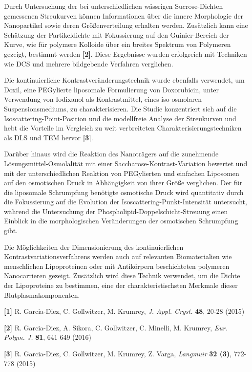 Durch Untersuchung der bei unterschiedlichen wässrigen Sucrose-Dichten gemessenen Streukurven können Informationen über die innere Morphologie der Nanopartikel sowie deren Größenverteilung erhalten werden. Zusätzlich kann eine Schätzung der Partikeldichte mit Fokussierung auf den Guinier-Bereich der Kurve, wie für polymere Kolloide über ein breites Spektrum von Polymeren gezeigt, bestimmt werden \textbf{[2]}. Diese Ergebnisse wurden erfolgreich mit Techniken wie DCS und mehrere bildgebende Verfahren verglichen.

Die kontinuierliche Kontrastveränderungstechnik wurde ebenfalls verwendet, um Doxil, eine PEGylierte liposomale Formulierung von Doxorubicin, unter Verwendung von Iodixanol als Kontrastmittel, eines iso-osmolaren Suspensionsmediums, zu charakterisieren. Die Studie konzentriert sich auf die Isoscattering-Point-Position und die modellfreie Analyse der Streukurven und hebt die Vorteile im Vergleich zu weit verbreiteten Charakterisierungstechniken als DLS und TEM hervor \textbf{[3]}.

Darüber hinaus wird die Reaktion des Nanoträgers auf die zunehmende Lösungsmittel-Osmolalität mit einer Saccharose-Kontrast-Variation bewertet und mit der unterschiedlichen Reaktion von PEGylierten und einfachen Liposomen auf den osmotischen Druck in Abhängigkeit von ihrer Größe verglichen. Der für die liposomale Schrumpfung benötigte osmotische Druck wird quantitativ durch die Fokussierung auf die Evolution der Isoscattering-Punkt-Intensität untersucht, während die Untersuchung der Phospholipid-Doppelschicht-Streuung einen Einblick in die morphologischen Veränderungen der osmotischen Schrumpfung gibt.

Die Möglichkeiten der Dimensionierung des kontinuierlichen Kontrastvariationsverfahrens werden auch auf relevanten Biomaterialien wie menschlichen Lipoproteinen oder mit Antikörpern beschichteten polymeren Nanocarrieren gezeigt. Zusätzlich wird diese Technik verwendet, um die Dichte der Lipoproteine zu bestimmen, eine der charakteristischsten Merkmale dieser Blutplasmakomponenten.

\bigskip
\footnotesize{

\textbf{[1]} R. Garcia-Diez, C. Gollwitzer, M. Krumrey, \emph{J. Appl. Cryst.} \textbf{48}, 20-28 (2015)

\textbf{[2]} R. Garcia-Diez, A. Sikora, C. Gollwitzer, C. Minelli, M. Krumrey, \emph{Eur. Polym. J.} \textbf{81}, 641-649 (2016)

\textbf{[3]} R. Garcia-Diez, C. Gollwitzer, M. Krumrey, Z. Varga, \emph{Langmuir} \textbf{32 (3)}, 772-778 (2015)

}
\normalsize

\cleardoublepage
